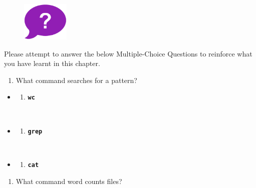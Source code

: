 \documentclass[
  letterpaper,
  DIV=11,
  numbers=noendperiod]{scrreprt}
\providecommand{\tightlist}{%
  \setlength{\itemsep}{0pt}\setlength{\parskip}{0pt}}\usepackage{longtable,booktabs,array}
\begin{document}
\begin{figure}

{\centering \includegraphics[width=0.2\textwidth,height=\textheight]{figures/question_bubble_purple.png}

}

\end{figure}

Please attempt to answer the below Multiple-Choice Questions to
reinforce what you have learnt in this chapter.

\begin{enumerate}
\def\labelenumi{\arabic{enumi}.}
\tightlist
\item
  What command searches for a pattern?
\end{enumerate}

\begin{itemize}
\item
  \begin{enumerate}
  \def\labelenumi{(\Alph{enumi})}
  \tightlist
  \item
    \textbf{\texttt{wc}}\strut \\
  \end{enumerate}
\item
  \begin{enumerate}
  \def\labelenumi{(\Alph{enumi})}
  \setcounter{enumi}{1}
  \tightlist
  \item
    \textbf{\texttt{grep}}\strut \\
  \end{enumerate}
\item
  \begin{enumerate}
  \def\labelenumi{(\Alph{enumi})}
  \setcounter{enumi}{2}
  \tightlist
  \item
    \textbf{\texttt{cat}}
  \end{enumerate}
\end{itemize}

\begin{enumerate}
\def\labelenumi{\arabic{enumi}.}
\setcounter{enumi}{1}
\tightlist
\item
  What command word counts files?
\end{enumerate}
\end{document}
